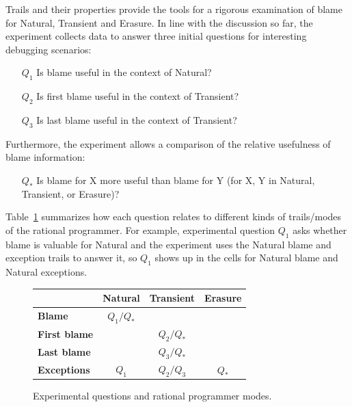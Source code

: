 
Trails and their properties provide the tools for a rigorous examination of
blame for Natural, Transient and Erasure. In line with the discussion so far,
the experiment collects data to answer three initial questions for 
interesting debugging scenarios:
\begin{itemize}
\item[$Q_1$] Is blame useful in the context of Natural?

\item[$Q_2$] Is first blame useful in the context of Transient?

\item[$Q_3$] Is last blame useful in the context of Transient?

\end{itemize}

Furthermore, the experiment allows a comparison of the relative usefulness of blame
information:
\begin{itemize}
\item[$Q_*$] Is blame for X more useful than blame for Y (for X, Y in Natural, Transient, or Erasure)?
\end{itemize}


Table~\ref{fig:experiment-outline} summarizes how each question relates to
different kinds of trails/modes of the rational programmer. For example, experimental
question $Q_1$ asks whether blame is valuable for Natural and the experiment
uses the Natural blame and exception trails to answer it, so $Q_1$ shows up in the cells for Natural blame and Natural exceptions.

\begin{figure}[ht]
\center
{\begin{tabular}{l|c|c|c}
                        & {\bf Natural}  & {\bf Transient} &  {\bf Erasure} \\ \hline 
{\bf Blame}             &  $Q_1/Q_*$    &                  &                \\
{\bf First blame}       &               &     $Q_2/Q_*$    &                 \\
{\bf Last blame}        &               &     $Q_3/Q_*$    &                 \\
{\bf Exceptions}        &      $Q_1$    &     $Q_2/Q_3$    &      $Q_*$      \\
\end{tabular}}
  \caption{ Experimental questions and rational programmer modes.}
  \label{fig:experiment-outline}
\end{figure}

